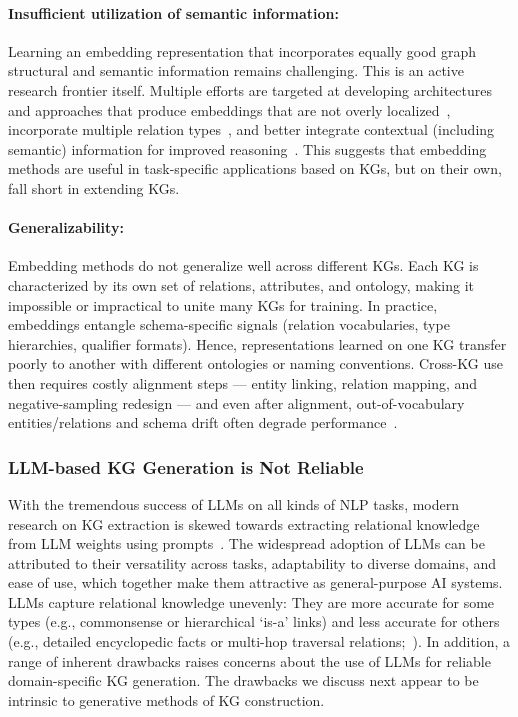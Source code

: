 \documentclass[10pt]{article}
\begin{document}
\paragraph{Insufficient utilization of semantic information:} Learning an embedding representation that incorporates equally good graph structural and semantic information remains challenging. This is an active research frontier itself. Multiple efforts are targeted at developing architectures and approaches that produce embeddings that are not overly localized~\cite{10490589}, incorporate multiple relation types~\cite{translational_kgc_model}, and better integrate contextual (including semantic) information for improved reasoning~\cite{10742302}. This suggests that embedding methods are useful in task-specific applications based on KGs, but on their own, fall short in extending KGs.

\paragraph{Generalizability:} Embedding methods do not generalize well across different KGs. Each KG is characterized by its own set of relations, attributes, and ontology, making it impossible or impractical to unite many KGs for training. In practice, embeddings entangle schema-specific signals (relation vocabularies, type hierarchies, qualifier formats). Hence, representations learned on one KG transfer poorly to another with different ontologies or naming conventions. Cross-KG use then requires costly alignment steps --- entity linking, relation mapping, and negative-sampling redesign --- and even after alignment, out-of-vocabulary entities/relations and schema drift often degrade performance~\cite{chen2023generalizing}.

\subsubsection{LLM-based KG Generation is Not Reliable}
\label{llm_kg_is_not_reliable}

With the tremendous success of LLMs on all kinds of NLP tasks, modern research on KG extraction is skewed towards extracting relational knowledge from LLM weights using prompts~\cite{LLM_for_kg_construction, carta2023iterativezeroshotllmprompting, LI2025104769, 10.1145/3691352}. The widespread adoption of LLMs can be attributed to their versatility across tasks, adaptability to diverse domains, and ease of use, which together make them attractive as general-purpose AI systems. LLMs capture relational knowledge unevenly: They are more accurate for some types (e.g., commonsense or hierarchical `is-a’ links) and less accurate for others (e.g., detailed encyclopedic facts or multi-hop traversal relations;~\citealt{pan_et_al:TGDK}).
In addition, a range of inherent drawbacks raises concerns about the use of LLMs for reliable domain-specific KG generation. The drawbacks we  discuss next appear to be intrinsic to generative methods of KG construction.
\end{document}
